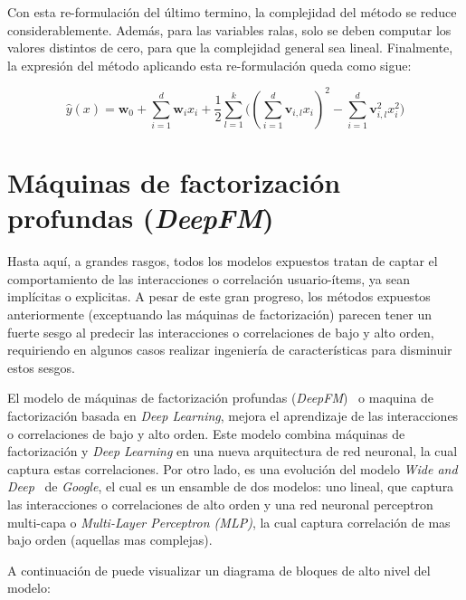 \documentclass[11pt,a4paper,twoside]{thesis}
\begin{document}
Con esta re-formulación del último termino, la complejidad del método se reduce
considerablemente. Además, para las variables ralas, solo se deben computar los
valores distintos de cero, para que la complejidad general sea lineal.
Finalmente, la expresión del método aplicando esta re-formulación queda como
sigue:

\begin{equation}
	\hat{y}(x) = \mathbf{w}_0 + \sum_{i=1}^d \mathbf{w}_i x_i + \frac{1}{2} \sum_{l=1}^k \big ((\sum_{i=1}^d \mathbf{v}_{i, l} x_i)^2 - \sum_{i=1}^d \mathbf{v}_{i, l}^2 x_i^2)
\end{equation}

\clearpage

\section{Máquinas de factorización profundas (\textit{DeepFM})}

Hasta aquí, a grandes rasgos, todos los modelos expuestos tratan de captar el
comportamiento de las interacciones o correlación usuario-ítems, ya sean
implícitas o explicitas. A pesar de este gran progreso, los métodos expuestos
anteriormente (exceptuando las máquinas de factorización) parecen tener un
fuerte sesgo al predecir las interacciones o correlaciones de bajo y alto
orden, requiriendo en algunos casos realizar ingeniería de características
para disminuir estos sesgos.

El modelo de máquinas de factorización profundas
(\textit{DeepFM})~\cite{dfmpaper, didldfm} o maquina de factorización basada en
\textit{Deep Learning}, mejora el aprendizaje de las interacciones o
correlaciones de bajo y alto orden. Este modelo combina máquinas de
factorización y \textit{Deep Learning} en una nueva arquitectura de red
neuronal, la cual captura estas correlaciones. Por otro lado, es una evolución
del modelo \textit{Wide and Deep}~\cite{wideanddeeppaper} de \textit{Google},
el cual es un ensamble de dos modelos: uno lineal, que captura las
interacciones o correlaciones de alto orden y una red neuronal perceptron
multi-capa o \textit{Multi-Layer Perceptron (MLP)}, la cual captura correlación
de mas bajo orden (aquellas mas complejas).

A continuación de puede visualizar un diagrama de bloques de alto nivel del
modelo:
\end{document}
